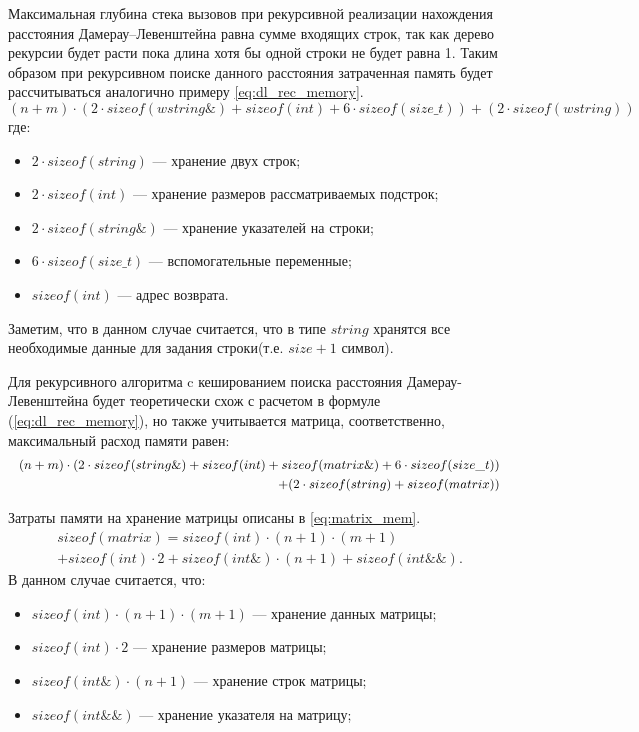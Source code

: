 Максимальная глубина стека вызовов при рекурсивной реализации нахождения расстояния Дамерау--Левенштейна равна сумме входящих строк,
так как дерево рекурсии будет расти пока длина хотя бы одной строки не будет равна 1. Таким образом при рекурсивном поиске данного расстояния затраченная память
будет рассчитываться  аналогично примеру \ref{eq:dl_rec_memory}.
\begin{equation}
	\label{eq:dl_rec_memory}
	(n + m) \cdot (2 \cdot sizeof(wstring\&) + sizeof(int) + 6 \cdot sizeof(size\_t)) +  (2 \cdot sizeof(wstring))
\end{equation}
где:
\begin{itemize}
	\item $2 \cdot sizeof(string)$ --- хранение двух строк;
	\item $2 \cdot sizeof(int)$ --- хранение размеров рассматриваемых подстрок;
	\item $2 \cdot sizeof(string\&)$ --- хранение указателей на строки;
	\item $6 \cdot sizeof(size\_t)$ --- вспомогательные переменные;
	\item $sizeof(int)$ --- адрес возврата.
\end{itemize}

Заметим, что в данном случае считается, что в типе $string$ хранятся все необходимые данные для задания строки(т.е. $size + 1$ символ).

Для рекурсивного алгоритма c кешированием поиска расстояния Дамерау-Левенштейна будет теоретически схож с расчетом в формуле (\ref{eq:dl_rec_memory}),
но также учитывается матрица, соответственно, максимальный расход памяти равен:
\begin{equation}
	\label{eq:dl_hash_memory}
    \small
	\begin{aligned}
		(n + m) \cdot (2 \cdot sizeof(string\&) + sizeof(int) + sizeof(matrix\&) + 6 \cdot sizeof(size\_t)) \\
        + (2 \cdot sizeof(string) + sizeof(matrix))
	\end{aligned}
\end{equation}

Затраты памяти на хранение матрицы описаны в  \ref{eq:matrix_mem}.
\begin{equation}
	\label{eq:matrix_mem}
    \begin{aligned}
	sizeof(matrix) = sizeof(int) \cdot (n+1) \cdot (m + 1)  \\
    + sizeof(int) \cdot 2 + sizeof(int\&) \cdot (n + 1) + sizeof(int\&\&).
    \end{aligned}
\end{equation}
В данном случае считается, что:
\begin{itemize}
	\item $sizeof(int) \cdot (n+1) \cdot (m + 1)$ --- хранение данных матрицы;
	\item $sizeof(int) \cdot 2$ --- хранение размеров матрицы;
	\item $sizeof(int\&) \cdot (n + 1)$ --- хранение строк матрицы;
	\item $sizeof(int\&\&)$ --- хранение указателя на матрицу;
\end{itemize}


